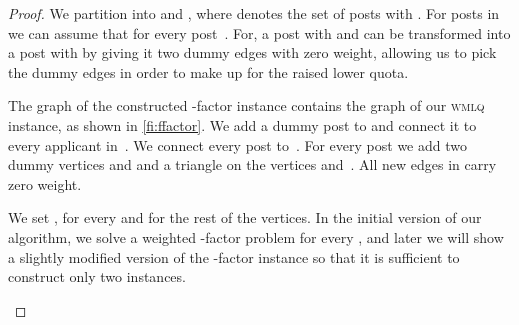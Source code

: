 \documentclass{llncs}
\begin{document}
\begin{proof}

We partition  into  and , where  denotes the set of posts with . For posts in  we can assume that  for every post~. For, a post  with  and  can be transformed into a post with  by giving it two dummy edges with zero weight, allowing us to pick the dummy edges in order to make up for the raised lower quota. 

The graph  of the constructed -factor instance contains the graph  of our \textsc{wmlq} instance, as shown in \cref{fi:ffactor}. We add a dummy post  to  and connect it to every applicant in~. We connect every post  to~. For every post  we add two dummy vertices  and  and a triangle on the vertices  and~. All new edges in  carry zero weight. 

We set ,  for every  and  for the rest of the vertices. In the initial version of our algorithm, we solve a weighted -factor problem for every , and later we will show a slightly modified version of the -factor instance so that it is sufficient to construct only two instances.
    
\begin{figure}[ht]
\centering
{}
\end{figure}
\end{proof}
\end{document}
